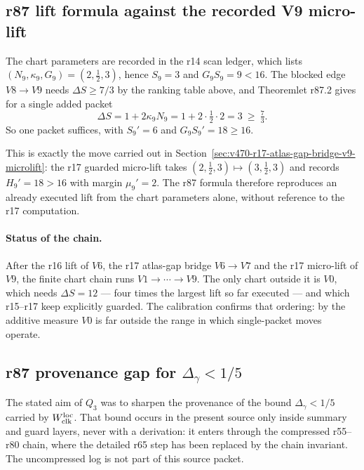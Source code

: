 \subsection*{r87 lift formula against the recorded V9 micro-lift}
\label{subsec:r87-v9-reduction}

The chart parameters are recorded in the r14 scan ledger, which lists
\((N_9,\kappa_9,G_9)=(2,\tfrac12,3)\), hence \(S_9=3\) and \(G_9S_9=9<16\).  The blocked
edge \(V8\to V9\) needs \(\Delta S\ge7/3\) by the ranking table above, and Theoremlet r87.2
gives for a single added packet
\[
\Delta S=1+2\kappa_9N_9=1+2\cdot\tfrac12\cdot2=3\ \ge\ \tfrac73 .
\]
So one packet suffices, with \(S_9'=6\) and \(G_9S_9'=18\ge16\).

This is exactly the move carried out in
Section~\ref{sec:v470-r17-atlas-gap-bridge-v9-microlift}: the r17 guarded micro-lift takes
\((2,\tfrac12,3)\mapsto(3,\tfrac12,3)\) and records \(H_9'=18>16\) with margin
\(\mu_9'=2\).  The r87 formula therefore reproduces an already executed lift from the chart
parameters alone, without reference to the r17 computation.

\paragraph{Status of the chain.}
After the r16 lift of \(V6\), the r17 atlas-gap bridge \(V6\to V7\) and the r17 micro-lift of
\(V9\), the finite chart chain runs \(V1\to\cdots\to V9\).  The only chart outside it is
\(V0\), which needs \(\Delta S=12\) --- four times the largest lift so far executed --- and
which r15--r17 keep explicitly guarded.  The calibration confirms that ordering: by the
additive measure \(V0\) is far outside the range in which single-packet moves operate.

\subsection*{r87 provenance gap for \texorpdfstring{\(\Delta_\gamma<1/5\)}{Delta gamma < 1/5}}
\label{subsec:r87-provenance-gap}

The stated aim of \(Q_3\) was to sharpen the provenance of the bound \(\Delta_\gamma<1/5\)
carried by \(W_{\rm clk}^{\rm loc}\).  That bound occurs in the present source only inside
summary and guard layers, never with a derivation: it enters through the compressed
r55--r80 chain, where the detailed r65 step has been replaced by the chain invariant.  The
uncompressed log is not part of this source packet.

